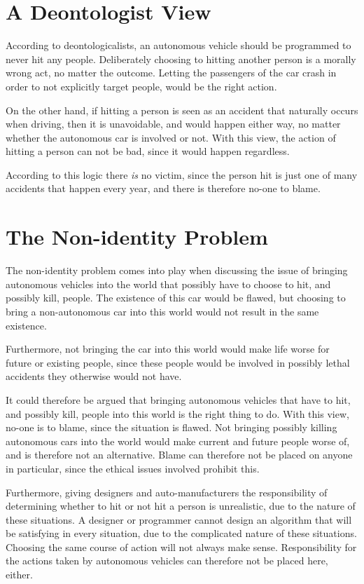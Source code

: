 \section{A Deontologist View}
\newpar According to deontologicalists, an autonomous vehicle should be programmed to never hit any people. Deliberately choosing to hitting another person is a morally wrong act, no matter the outcome. Letting the passengers of the car crash in order to not explicitly target people, would be the right action. 

On the other hand, if hitting a person is seen as an accident that naturally occurs when driving, then it is unavoidable, and would happen either way, no matter whether the autonomous car is involved or not. With this view, the action of hitting a person can not be bad, since it would happen regardless. 

According to this logic there \textit{is} no victim, since the person hit is just one of many accidents that happen every year, and there is therefore no-one to blame.

\section{The Non-identity Problem}
\newpar The non-identity problem comes into play when discussing the issue of bringing autonomous vehicles into the world that possibly have to choose to hit, and possibly kill, people. The existence of this car would be flawed, but choosing to bring a non-autonomous car into this world would not result in the same existence. 

Furthermore, not bringing the car into this world would make life worse for future or existing people, since these people would be involved in possibly lethal accidents they otherwise would not have.

\newpar It could therefore be argued that bringing autonomous vehicles that have to hit, and possibly kill, people into this world is the right thing to do. 
With this view, no-one is to blame, since the situation is flawed. Not bringing possibly killing autonomous cars into the world would make current and future people worse of, and is therefore not an alternative. Blame can therefore not be placed on anyone in particular, since the ethical issues involved prohibit this. 

\newpar Furthermore, giving designers and auto-manufacturers the responsibility of determining whether to hit or not hit a person is unrealistic, due to the nature of these situations. A designer or programmer cannot design an algorithm that will be satisfying in every situation, due to the complicated nature of these situations. Choosing the same course of action will not always make sense. Responsibility for the actions taken by autonomous vehicles can therefore not be placed here, either.   

